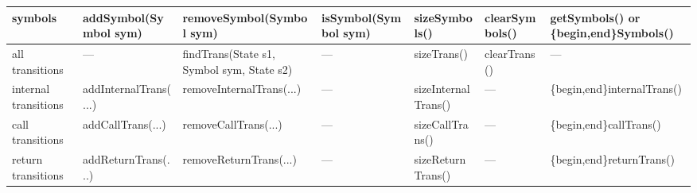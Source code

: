 \begin{sidewaystable}
\begin{threeparttable}
\begin{tabular}{p{0.55in}p{1.40in}p{1.45in}p{1.2in}p{1.12in}p{1.05in}p{1.35in}}
symbols\tnote{5} &  addSymbol(Symbol sym)                   &  removeSymbol(Symbol sym)\tnote{4}        &  isSymbol(Symbol sym)      &  sizeSymbols()        &  clearSymbols()            &  getSymbols() or \newline
                                                                                                                                                                                             \{begin,end\}Symbols()         \\
\hline %
all \newline
transitions      &  ---                                     &  findTrans(State s1, \newline
                                                               \phantom{find}Symbol sym, State s2)&  ---                       &  sizeTrans()          &  clearTrans()              &  ---                           \\
internal \newline
transitions      &  addInternalTrans(\phantom{.}...\tnote{6}\phantom{a})
                                                            &  removeInternalTrans(\phantom{.}...\tnote{6}\phantom{a})
                                                                                                        &  ---                       &  sizeInternalTrans()  &  ---                       &  \{begin,end\}internalTrans()  \\
call \newline
transitions      &  addCallTrans(\phantom{.}...\tnote{6}\phantom{a})
                                                            &  removeCallTrans(\phantom{.}...\tnote{6}\phantom{a})
                                                                                                        &  ---                       &  sizeCallTrans()      &  ---                       &  \{begin,end\}callTrans()      \\
return \newline
transitions      &  addReturnTrans(\phantom{.}...\tnote{6}\phantom{a})
                                                            &  removeReturnTrans(\phantom{.}...\tnote{6}\phantom{a})
                                                                                                        &  ---                       &  sizeReturnTrans()  &  ---                       &  \{begin,end\}returnTrans()\\

\end{tabular}
\end{threeparttable}
\end{sidewaystable}
